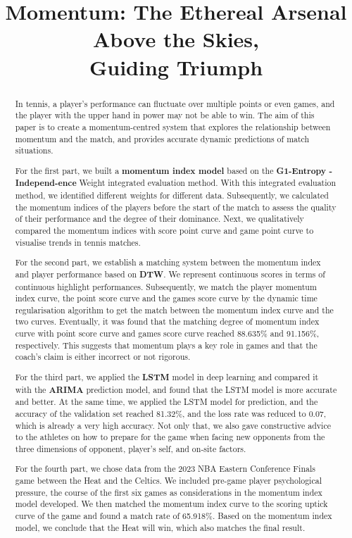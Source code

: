 \documentclass[12pt]{article}  %
\title{Momentum: The Ethereal Arsenal Above the Skies, \\Guiding Triumph}  %
\begin{document}
\begin{abstract}
    

    
In tennis, a player's performance can fluctuate over multiple points or even games, and the player with the upper hand in power may not be able to win. The aim of this paper is to create a momentum-centred system that explores the relationship between momentum and the match, and provides accurate dynamic predictions of match situations.

For the first part, we built a \textbf{momentum index model} based on the \textbf{G1-Entropy -Independ-}\textbf{ence} Weight integrated evaluation method. With this integrated evaluation method, we identified different weights for different data. Subsequently, we calculated the momentum indices of the players before the start of the match to assess the quality of their performance and the degree of their dominance. Next, we qualitatively compared the momentum indices with score point curve and game point curve to visualise trends in tennis matches.

For the second part, we establish a matching system between the momentum index and player performance based on \textbf{DTW}. We represent continuous scores in terms of continuous highlight performances. Subsequently, we match the player momentum index curve, the point score curve and the games score curve by the dynamic time regularisation algorithm to get the match between the momentum index curve and the two curves. Eventually, it was found that the matching degree of momentum index curve with point score curve and games score curve reached 88.635\% and 91.156\%, respectively. This suggests that momentum plays a key role in games and that the coach's claim is either incorrect or not rigorous.

For the third part, we applied the \textbf{LSTM} model in deep learning and compared it with the \textbf{ARIMA} prediction model, and found that the LSTM model is more accurate and better. At the same time, we applied the LSTM model for prediction, and the accuracy of the validation set reached 81.32\%, and the loss rate was reduced to 0.07, which is already a very high accuracy. Not only that, we also gave constructive advice to the athletes on how to prepare for the game when facing new opponents from the three dimensions of opponent, player's self, and on-site factors.

For the fourth part, we chose data from the 2023 NBA Eastern Conference Finals game between the Heat and the Celtics. We included pre-game player psychological pressure, the course of the first six games as considerations in the momentum index model developed. We then matched the momentum index curve to the scoring uptick curve of the game and found a match rate of 65.918\%. Based on the momentum index model, we conclude that the Heat will win, which also matches the final result.


\end{abstract}
\end{document}
